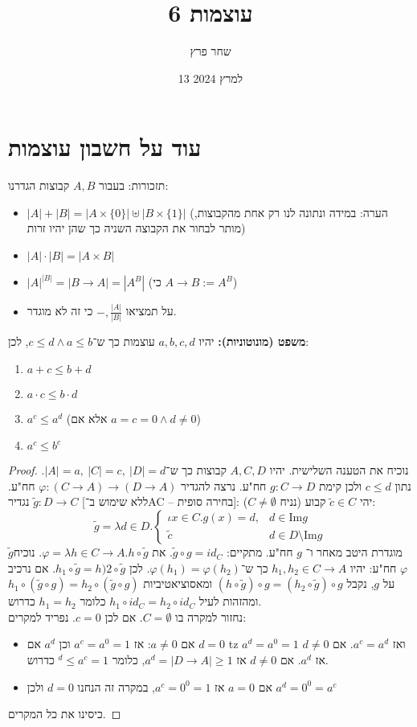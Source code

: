\documentclass[]{article}
\title{עוצמות 6}
\author{שחר פרץ}
\date{13 למרץ 2024}
\newcommand\vphi  {\varphi}
\newcommand\Img   {\text{Im}}
\newcommand\tl[1] {\tilde{#1}}
\begin{document}
	\maketitle
	\section*{עוד על חשבון עוצמות}
	תזכורות: בעבור $ A, B $ קבוצות הגדרנו: 
	\begin{itemize}
		\item $ |A| + |B| = |A \times \{0\}| \uplus |B \times \{1\}| $ (הערה: במידה ונתונה לנו רק אחת מהקבוצות, מותר לבחור את הקבוצה השניה כך שהן יהיו זרות)
		\item $ |A| \cdot |B| = |A \times B| $
		\item $ |A|^{|B|} = |B \to A| = |A^B| $ (כי $ A \to B := A^B $)
		\item על תמציאו $ -, \tfrac{|A|}{|B|} $ כי זה לא מוגדר. 
	\end{itemize}
	\textbf{משפט (מונוטוניות): }יהיו $ a, b, c, d $ עוצמות כך ש־$ c \le d \land a \le b $, לכן: 
	\begin{enumerate}
		\item $ a + c \le b + d $
		\item $ a \cdot c \le b \cdot d $
		\item $ a^c \le a^d $ (אלא אם $ a = c = 0 \land d \neq 0 $)
		\item $ a^c \le b^c $
	\end{enumerate}
	\begin{proof}
		נוכיח את הטענה השלישית. יהיו $ A, C, D $ קבוצות כך ש־$ |A| = a, \ |C| = c, \ |D| = d $. נתון $ c \le d $ ולכן קימת $ g \colon C \to D $ חח"ע. נרצה להגדיר $ \vphi \colon (C \to A) \to (D \to A) $ חח"ע. נגדיר $ \tl{g} \colon D \to C $ [ללא שימוש ב־AC – בחירה סופית]: יהי $ \tl{c} \in C $ קבוע (נניח $ C \neq \emptyset $): 
	\[ \tl{g} = \lambda d \in D. \begin{cases}
		\iota x \in C. g(x) = d, & d \in \Img g \\
		\tl{c} & d \in D \setminus \Img g
	\end{cases} \]
	$ \tl{g} $מוגדרת היטב מאחר ו־ $ g $ חח"ע. מתקיים: $ \tl{g} \circ g = id_C $. את $ \vphi = \lambda h \in C \to A. h \circ \tl{g} $. נוכיח $ \vphi $ חח"ע: יהיו $ h_1, h_2 \in C \to A $ כך ש־$ \vphi(h_1) = \vphi(h_2) $. לכן $ h_1 \circ \tl{g} = h)2 \circ \tl{g} $. אם נרכיב על $ g $, נקבל $ (h \circ \tl{g}) \circ g = (h_2 \circ \tl{g}) \circ g $ ומאסוציאטיביות $ h_1 \circ ( \tl{g} \circ g) = h_2 \circ(\tl{g} \circ g) $ ומהזהות לעיל $ h_1 \circ id_C = h_2 \circ id_C $ כלומר $ h_1 = h_2 $ כדרוש. \\
	נחזור למקרה בו $ C = \emptyset $. אם לכן $ c = 0 $. נפריד למקרים: 
	\begin{itemize}
		\item אם $ a \neq 0 $: אז $ a^c = a^0 = 1 $ וכן $ a^d $ אם $ d = 0 $ tz $ a^d = a^0 = 1 $ ואז $ a^c = a^d $. אם $ d \neq 0 $ אז $ a^d $. אם $ d \neq 0 $ אז $ a^d = |D \to A| \ge 1 $, כלומר $ ^d \le a^c = 1 $ כדרוש. 
		\item אם $ a = 0 $ אז $ a^c = 0^0 = 1 $, במקרה זה הנחנו $ d = 0 $ ולכן $ a^d = 0^0 = a^c $
	\end{itemize}
	כיסינו את כל המקרים. 
	\end{proof}
\end{document}
